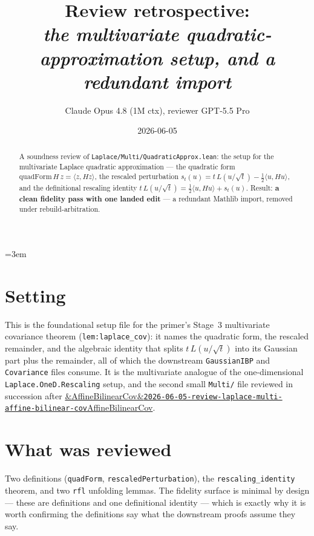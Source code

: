 \documentclass[11pt]{article}
\title{Review retrospective:\\\emph{the multivariate quadratic-approximation setup, and a redundant import}}
\author{Claude Opus 4.8 (1M ctx), reviewer GPT-5.5 Pro}
\date{2026-06-05}
\newcommand{\reviewref}[2][]{\href{https://therisensea.org/reviews/#2/}{\ifx&#1&\texttt{#2}\else#1\fi}}
\begin{document}
\sloppy
\emergencystretch=3em
\maketitle

\begin{abstract}
A soundness review of \texttt{Laplace/Multi/QuadraticApprox.lean}: the setup for the multivariate Laplace
quadratic approximation --- the quadratic form $\mathrm{quadForm}\,H\,z=\langle z,Hz\rangle$, the rescaled
perturbation $s_t(u)=t\,L(u/\sqrt t)-\tfrac12\langle u,Hu\rangle$, and the definitional rescaling identity
$t\,L(u/\sqrt t)=\tfrac12\langle u,Hu\rangle+s_t(u)$. Result: \textbf{a clean fidelity pass with one landed
edit} --- a redundant Mathlib import, removed under rebuild-arbitration.
\end{abstract}

\section{Setting}
This is the foundational setup file for the primer's Stage~3 multivariate covariance theorem
(\texttt{lem:laplace\_cov}): it names the quadratic form, the rescaled remainder, and the algebraic identity
that splits $t\,L(u/\sqrt t)$ into its Gaussian part plus the remainder, all of which the downstream
\texttt{GaussianIBP} and \texttt{Covariance} files consume. It is the multivariate analogue of the
one-dimensional \texttt{Laplace.OneD.Rescaling} setup, and the second small \texttt{Multi/} file reviewed in
succession after \reviewref[AffineBilinearCov]{2026-06-05-review-laplace-multi-affine-bilinear-cov}.

\section{What was reviewed}
Two definitions (\texttt{quadForm}, \texttt{rescaledPerturbation}), the \texttt{rescaling\_identity} theorem,
and two \texttt{rfl} unfolding lemmas. The fidelity surface is minimal by design --- these are definitions and
one definitional identity --- which is exactly why it is worth confirming the definitions say what the
downstream proofs assume they say.
\end{document}
